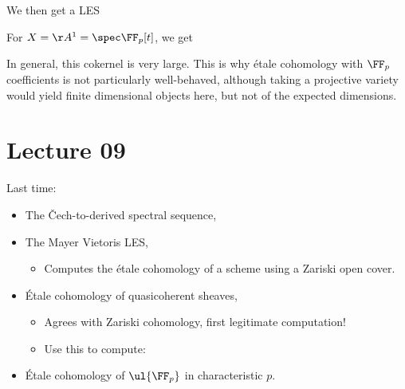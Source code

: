 \begin{example}[?]
We then get a LES

\begin{center}
\end{center}

For \(X = \AA^1 = \spec \FF_p[t]\), we get

\begin{center}
\end{center}

In general, this cokernel is very large. This is why étale cohomology
with \(\FF_p\) coefficients is not particularly well-behaved, although
taking a projective variety would yield finite dimensional objects here,
but not of the expected dimensions.

\end{example}

\hypertarget{lecture-09}{%
\section{Lecture 09}\label{lecture-09}}

Last time:

\begin{itemize}
\tightlist
\item
  The Čech-to-derived spectral sequence,
\item
  The Mayer Vietoris LES,

  \begin{itemize}
  \tightlist
  \item
    Computes the étale cohomology of a scheme using a Zariski open
    cover.
  \end{itemize}
\item
  Étale cohomology of quasicoherent sheaves,

  \begin{itemize}
  \tightlist
  \item
    Agrees with Zariski cohomology, first legitimate computation!
  \item
    Use this to compute:
  \end{itemize}
\item
  Étale cohomology of \(\ul{\FF_p}\) in characteristic \(p\).
\end{itemize}

